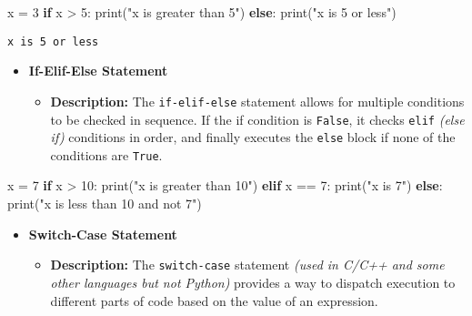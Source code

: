 \documentclass[
  letterpaper,
  DIV=11,
  numbers=noendperiod]{scrreprt}
\newenvironment{Shaded}{\begin{snugshade}}{\end{snugshade}}
\newcommand{\BuiltInTok}[1]{\textcolor[rgb]{0.00,0.23,0.31}{#1}}
\newcommand{\ControlFlowTok}[1]{\textcolor[rgb]{0.00,0.23,0.31}{\textbf{#1}}}
\newcommand{\DecValTok}[1]{\textcolor[rgb]{0.68,0.00,0.00}{#1}}
\newcommand{\NormalTok}[1]{\textcolor[rgb]{0.00,0.23,0.31}{#1}}
\newcommand{\OperatorTok}[1]{\textcolor[rgb]{0.37,0.37,0.37}{#1}}
\newcommand{\StringTok}[1]{\textcolor[rgb]{0.13,0.47,0.30}{#1}}
\providecommand{\tightlist}{%
  \setlength{\itemsep}{0pt}\setlength{\parskip}{0pt}}
\begin{document}
\begin{tcolorbox}[enhanced jigsaw, colframe=quarto-callout-note-color-frame, toprule=.15mm, bottomrule=.15mm, rightrule=.15mm, colback=white, breakable, arc=.35mm, opacityback=0, left=2mm, leftrule=.75mm]
\begin{Shaded}
\begin{Highlighting}[]
\NormalTok{x }\OperatorTok{=} \DecValTok{3}
\ControlFlowTok{if}\NormalTok{ x }\OperatorTok{\textgreater{}} \DecValTok{5}\NormalTok{:}
    \BuiltInTok{print}\NormalTok{(}\StringTok{"x is greater than 5"}\NormalTok{)}
\ControlFlowTok{else}\NormalTok{:}
    \BuiltInTok{print}\NormalTok{(}\StringTok{"x is 5 or less"}\NormalTok{)}
\end{Highlighting}
\end{Shaded}

\begin{verbatim}
x is 5 or less
\end{verbatim}

\begin{itemize}
\item
  \textbf{If-Elif-Else Statement}

  \begin{itemize}
  \tightlist
  \item
    \textbf{Description:} The \texttt{if-elif-else} statement allows for
    multiple conditions to be checked in sequence. If the if condition
    is \texttt{False}, it checks \texttt{elif} \emph{(else if)}
    conditions in order, and finally executes the \texttt{else} block if
    none of the conditions are \texttt{True}.
  \end{itemize}
\end{itemize}

\begin{Shaded}
\begin{Highlighting}[]
\NormalTok{x }\OperatorTok{=} \DecValTok{7}
\ControlFlowTok{if}\NormalTok{ x }\OperatorTok{\textgreater{}} \DecValTok{10}\NormalTok{:}
    \BuiltInTok{print}\NormalTok{(}\StringTok{"x is greater than 10"}\NormalTok{)}
\ControlFlowTok{elif}\NormalTok{ x }\OperatorTok{==} \DecValTok{7}\NormalTok{:}
    \BuiltInTok{print}\NormalTok{(}\StringTok{"x is 7"}\NormalTok{)}
\ControlFlowTok{else}\NormalTok{:}
    \BuiltInTok{print}\NormalTok{(}\StringTok{"x is less than 10 and not 7"}\NormalTok{)}
\end{Highlighting}
\end{Shaded}

\begin{itemize}
\item
  \textbf{Switch-Case Statement}

  \begin{itemize}
  \tightlist
  \item
    \textbf{Description:} The \texttt{switch-case} statement \emph{(used
    in C/C++ and some other languages but not Python)} provides a way to
    dispatch execution to different parts of code based on the value of
    an expression.
  \end{itemize}
\end{itemize}


\end{tcolorbox}
\end{document}
